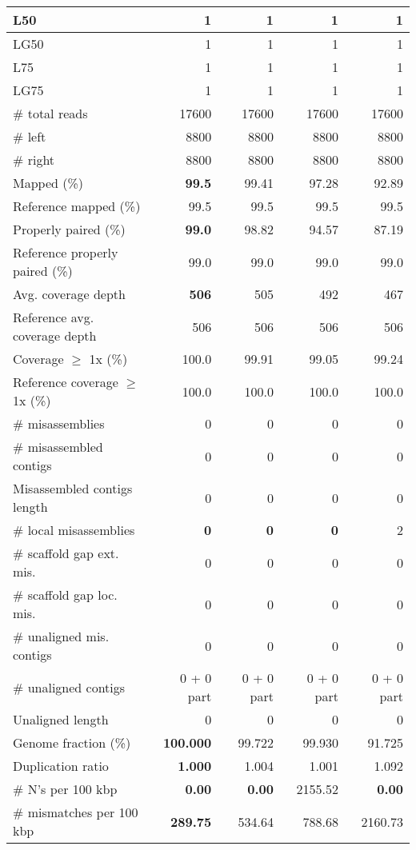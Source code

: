 \documentclass[12pt,a4paper]{article}
\begin{document}
\begin{table}[ht]
\begin{center}
\begin{tabular}{|l*{4}{|r}|}
L50 & 1 & 1 & 1 & 1 \\ \hline
LG50 & 1 & 1 & 1 & 1 \\ \hline
L75 & 1 & 1 & 1 & 1 \\ \hline
LG75 & 1 & 1 & 1 & 1 \\ \hline
\# total reads & 17600 & 17600 & 17600 & 17600 \\ \hline
\# left & 8800 & 8800 & 8800 & 8800 \\ \hline
\# right & 8800 & 8800 & 8800 & 8800 \\ \hline
Mapped (\%) & {\bf 99.5} & 99.41 & 97.28 & 92.89 \\ \hline
Reference mapped (\%) & 99.5 & 99.5 & 99.5 & 99.5 \\ \hline
Properly paired (\%) & {\bf 99.0} & 98.82 & 94.57 & 87.19 \\ \hline
Reference properly paired (\%) & 99.0 & 99.0 & 99.0 & 99.0 \\ \hline
Avg. coverage depth & {\bf 506} & 505 & 492 & 467 \\ \hline
Reference avg. coverage depth & 506 & 506 & 506 & 506 \\ \hline
Coverage $\geq$ 1x (\%) & 100.0 & 99.91 & 99.05 & 99.24 \\ \hline
Reference coverage $\geq$ 1x (\%) & 100.0 & 100.0 & 100.0 & 100.0 \\ \hline
\# misassemblies & 0 & 0 & 0 & 0 \\ \hline
\# misassembled contigs & 0 & 0 & 0 & 0 \\ \hline
Misassembled contigs length & 0 & 0 & 0 & 0 \\ \hline
\# local misassemblies & {\bf 0} & {\bf 0} & {\bf 0} & 2 \\ \hline
\# scaffold gap ext. mis. & 0 & 0 & 0 & 0 \\ \hline
\# scaffold gap loc. mis. & 0 & 0 & 0 & 0 \\ \hline
\# unaligned mis. contigs & 0 & 0 & 0 & 0 \\ \hline
\# unaligned contigs & 0 + 0 part & 0 + 0 part & 0 + 0 part & 0 + 0 part \\ \hline
Unaligned length & 0 & 0 & 0 & 0 \\ \hline
Genome fraction (\%) & {\bf 100.000} & 99.722 & 99.930 & 91.725 \\ \hline
Duplication ratio & {\bf 1.000} & 1.004 & 1.001 & 1.092 \\ \hline
\# N's per 100 kbp & {\bf 0.00} & {\bf 0.00} & 2155.52 & {\bf 0.00} \\ \hline
\# mismatches per 100 kbp & {\bf 289.75} & 534.64 & 788.68 & 2160.73 \\ \hline

\end{tabular}
\end{center}
\end{table}
\end{document}
